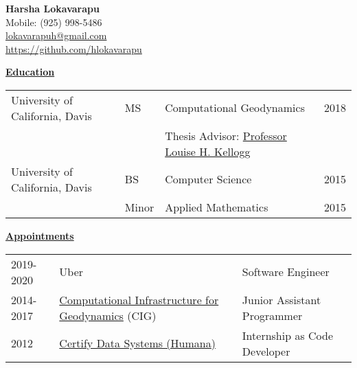 \documentclass[11pt]{ltxdoc}
\begin{document}
\begin{center}
  \textbf{Harsha Lokavarapu}                                            \\ [06pt]
  Mobile: (925) 998-5486                                                \\
 \href{mailto:lokavarapuh@gmail.com}{lokavarapuh@gmail.com}             \\
  \href{https://github.com/hlokavarapu}{https://github.com/hlokavarapu} \\ [3pt]
\end{center}


\vskip 12pt

\begin{center}
	\textbf{\underline{Education}}
\end{center}

\vskip -06pt

\begin{center}
\begin{tabular}{llll}
University of California, Davis              &MS       &Computational Geodynamics      & 2018 \\
                                             &       &Thesis Advisor: \href{http://geology.ucdavis.edu/people/faculty/kellogg.php}{Professor Louise H. Kellogg}        &  \\
University of California, Davis              &BS      & Computer Science                         & 2015       \\
                                             &Minor   & Applied Mathematics                      & 2015
\end{tabular}
\end{center}

\vskip 18pt

\begin{center}
	\textbf{\underline{Appointments}}
\end{center}

\begin{center}
\begin{tabular}{lll}
2019-2020     & Uber & Software Engineer \\
2014-2017     & \href{https://geodynamics.org/cig/}{Computational Infrastructure for Geodynamics} (CIG) & Junior Assistant Programmer \\
2012       & \href{https://www.humana.com}{Certify Data Systems (Humana)} & Internship as Code Developer
\end{tabular}
\end{center}
\end{document}
